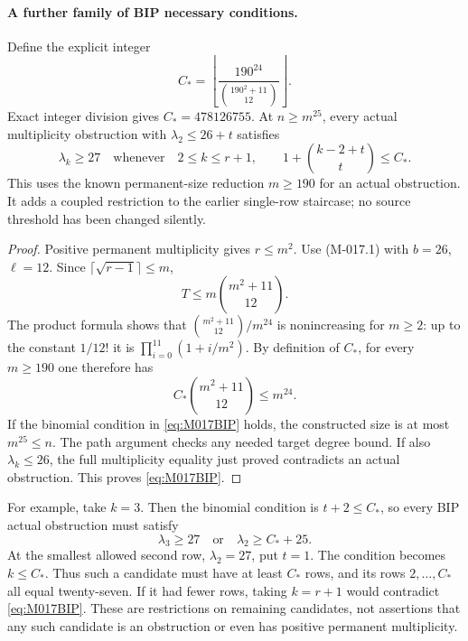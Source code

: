 \paragraph{A further family of BIP necessary conditions.}
Define the explicit integer
\[
                  C_*=
       \left\lfloor\frac{190^{24}}{\binom{190^2+11}{12}}\right\rfloor.
                                                               \tag{M-017.4}
\]
Exact integer division gives \(C_*=478126755\).
At \(n\geq m^{25}\), every actual multiplicity obstruction
with \(\lambda_2\leq26+t\) satisfies
\begin{equation}\label{eq:M017BIP}
 \lambda_k\geq27
 \quad\text{whenever}\quad
 2\leq k\leq r+1,\qquad
                      1+\binom{k-2+t}{t}\leq C_*.
\end{equation}
This uses the known permanent-size reduction \(m\geq190\)
for an actual obstruction. It adds a coupled restriction
to the earlier single-row staircase; no source threshold
has been changed silently.

\begin{proof}
Positive permanent multiplicity gives \(r\leq m^2\).
Use (M-017.1) with \(b=26\), \(\ell=12\).
Since \(\lceil\sqrt{r-1}\rceil\leq m\),
\[
            T\leq m\binom{m^2+11}{12}.
\]
The product formula shows that
\(\binom{m^2+11}{12}/m^{24}\) is nonincreasing
for \(m\geq2\): up to the constant \(1/12!\)
it is \(\prod_{i=0}^{11}(1+i/m^2)\).
By definition of \(C_*\), for every \(m\geq190\)
one therefore has
\[
                  C_*\binom{m^2+11}{12}\leq m^{24}.
\]
If the binomial condition in \eqref{eq:M017BIP} holds,
the constructed size is at most \(m^{25}\leq n\).
The path argument checks any needed target degree bound.
If also \(\lambda_k\leq26\), the full multiplicity
equality just proved contradicts an actual obstruction.
This proves \eqref{eq:M017BIP}.
\end{proof}

For example, take \(k=3\). Then the binomial condition
is \(t+2\leq C_*\), so every BIP actual obstruction
must satisfy
\[
                     \lambda_3\geq27
                         \quad\text{or}\quad\lambda_2\geq C_*+25.
                                                               \tag{M-017.5}
\]
At the smallest allowed second row, \(\lambda_2=27\),
put \(t=1\). The condition becomes \(k\leq C_*\).
Thus such a candidate must have at least \(C_*\) rows,
and its rows \(2,\ldots,C_*\) all equal twenty-seven.
If it had fewer rows, taking \(k=r+1\) would contradict
\eqref{eq:M017BIP}. These are restrictions on remaining
candidates, not assertions that any such candidate is an
obstruction or even has positive permanent multiplicity.

